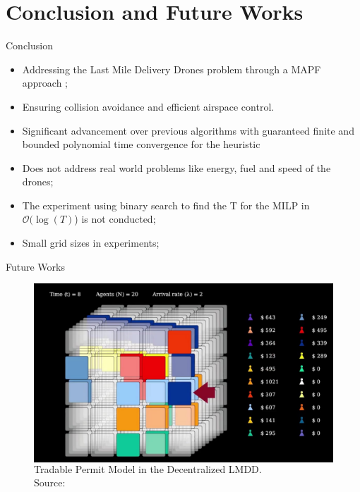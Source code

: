 \section{Conclusion and Future Works}

\begin{frame}{Conclusion}


\begin{itemize}
    \item  Addressing the Last Mile Delivery Drones problem through a MAPF approach ;
    \item Ensuring collision avoidance and efficient airspace control.
    \item Significant advancement over previous algorithms with guaranteed finite and bounded polynomial time convergence for the heuristic
\end{itemize}

\bigskip


\begin{itemize}
    \item Does not address real world problems like energy, fuel and speed of the drones;
    \item The experiment using binary search to find the T for the MILP in $\mathcal{O}( \log( T)$) is not conducted;
    \item Small grid sizes in experiments;
\end{itemize}

\end{frame}

\begin{frame}{Future Works}
    \begin{figure}
      \begin{columns}
        \caption{Tradable Permit Model in the Decentralized LMDD. \\ Source: \cite{Verri}}
        \label{fig:trad_drones}
        \includegraphics[width=\textwidth]{img/trad_drones-pdf-jpg-to-pdf.pdf}
      \end{columns}
    \end{figure}

\end{frame}


